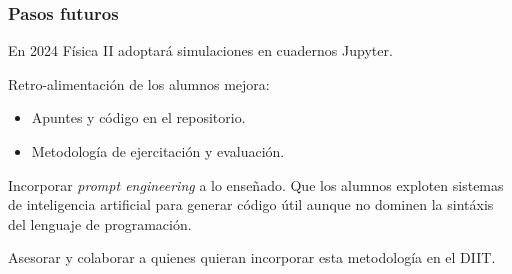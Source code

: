\documentclass[aspectratio=43]{beamer}
\begin{document}
\begin{frame}
	\frametitle{Pasos futuros}
	\begin{block}{}
 		\begin{description}[<+->]
			\item [Replicar] En 2024 Física II adoptará simulaciones en cuadernos Jupyter.
			\item [Adaptar] Retro-alimentación de los alumnos mejora:
				\begin{itemize}
					\item Apuntes y código en el repositorio.
					\item Metodología de ejercitación y evaluación.
				\end{itemize}
			\item [Actualizar] Incorporar \emph{prompt engineering} a lo enseñado. Que los alumnos exploten sistemas de inteligencia artificial para generar código útil aunque no dominen la sintáxis del lenguaje de programación.
			\item [Difundir] Asesorar y colaborar a quienes quieran incorporar esta metodología en el DIIT.
		\end{description}
	\end{block}
\end{frame}
\end{document}
